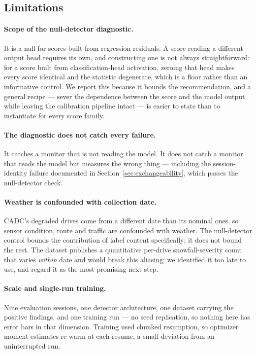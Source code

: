 \subsection{Limitations}
\label{sec:limitations}

\paragraph{Scope of the null-detector diagnostic.} It is a null for scores
built from regression residuals. A score reading a different output head
requires its own, and constructing one is not always straightforward: for a
score built from classification-head activation, zeroing that head makes
every score identical and the statistic degenerate, which is a floor rather
than an informative control. We report this because it bounds the
recommendation, and a general recipe --- sever the dependence between the
score and the model output while leaving the calibration pipeline
intact --- is easier to state than to instantiate for every score family.

\paragraph{The diagnostic does not catch every failure.} It catches a
monitor that is not reading the model. It does not catch a monitor that
reads the model but measures the wrong thing --- including the
session-identity failure documented in Section~\ref{sec:exchangeability},
which passes the null-detector check.

\paragraph{Weather is confounded with collection date.} CADC's degraded
drives come from a different date than its nominal ones, so sensor
condition, route and traffic are confounded with weather. The
null-detector control bounds the contribution of label content
specifically; it does not bound the rest. The dataset publishes a
quantitative per-drive snowfall-severity count that varies \emph{within}
date and would break this aliasing; we identified it too late to use, and
regard it as the most promising next step.

\paragraph{Scale and single-run training.} Nine evaluation sessions, one
detector architecture, one dataset carrying the positive findings, and one
training run --- no seed replication, so nothing here has error bars in
that dimension. Training used chunked resumption, so optimizer moment
estimates re-warm at each resume, a small deviation from an uninterrupted
run.

